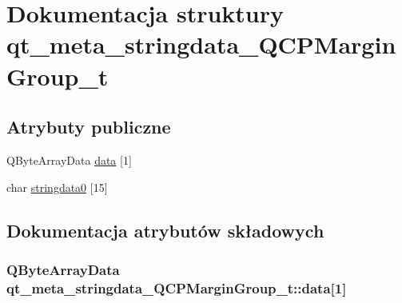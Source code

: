 \hypertarget{structqt__meta__stringdata___q_c_p_margin_group__t}{}\section{Dokumentacja struktury qt\+\_\+meta\+\_\+stringdata\+\_\+\+Q\+C\+P\+Margin\+Group\+\_\+t}
\label{structqt__meta__stringdata___q_c_p_margin_group__t}
\subsection*{Atrybuty publiczne}
\begin{DoxyCompactItemize}
\item 
Q\+Byte\+Array\+Data \hyperlink{structqt__meta__stringdata___q_c_p_margin_group__t_a99abe4f941bb7fbdfd988480fd5e6dc9}{data} \mbox{[}1\mbox{]}
\item 
char \hyperlink{structqt__meta__stringdata___q_c_p_margin_group__t_aea2e8169d7b920f953fc3d240d03082b}{stringdata0} \mbox{[}15\mbox{]}
\end{DoxyCompactItemize}


\subsection{Dokumentacja atrybutów składowych}
\subsubsection[{\texorpdfstring{data}{data}}]{\setlength{\rightskip}{0pt plus 5cm}Q\+Byte\+Array\+Data qt\+\_\+meta\+\_\+stringdata\+\_\+\+Q\+C\+P\+Margin\+Group\+\_\+t\+::data\mbox{[}1\mbox{]}}\hypertarget{structqt__meta__stringdata___q_c_p_margin_group__t_a99abe4f941bb7fbdfd988480fd5e6dc9}{}\label{structqt__meta__stringdata___q_c_p_margin_group__t_a99abe4f941bb7fbdfd988480fd5e6dc9}
